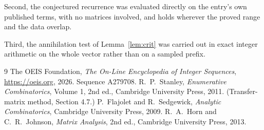 \documentclass[11pt,a4paper]{article}
\theoremstyle{plain}
\theoremstyle{definition}
\begin{document}
Second, the conjectured recurrence was evaluated directly on the entry's own published terms,
with no matrices involved, and holds wherever the proved range and the data overlap.

Third, the annihilation test of Lemma~\ref{lem:crit} was carried out in exact integer
arithmetic on the whole vector rather than on a sampled prefix.

\begin{thebibliography}{9}
 The OEIS Foundation, \emph{The On-Line Encyclopedia of Integer
Sequences}, \url{https://oeis.org}, 2026. Sequence A279708.
 R.~P.~Stanley, \emph{Enumerative Combinatorics}, Volume 1, 2nd ed.,
Cambridge University Press, 2011. (Transfer-matrix method, Section 4.7.)
 P.~Flajolet and R.~Sedgewick, \emph{Analytic Combinatorics}, Cambridge
University Press, 2009.
 R.~A.~Horn and C.~R.~Johnson, \emph{Matrix Analysis}, 2nd ed., Cambridge
University Press, 2013.
\end{thebibliography}
\end{document}
